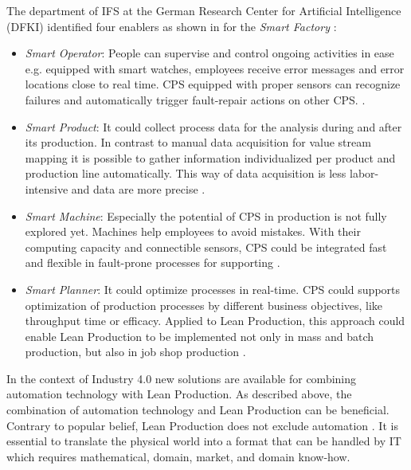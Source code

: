 {The department of \acs{IFS} at the German Research Center for Artificial Intelligence (\acs{DFKI}) identified four enablers as shown in  for the \textit{Smart Factory} \cite{LEANKOLBERG}: 
\begin{itemize}
	\item \textit{Smart Operator}: People can supervise and control ongoing activities in ease e.g. equipped with smart watches, employees receive error messages and error locations close to real time. \acs{CPS} equipped with proper sensors can recognize failures and automatically trigger fault-repair actions on other \acs{CPS}. \cite{LEANKOLBERG}.
	\item \textit{Smart Product}: It could collect process data for the analysis during and after its production. In contrast to manual data acquisition for value stream mapping it is possible to gather information individualized per product and production line automatically. This way of data acquisition is less labor-intensive and data are more precise \cite{LEANKOLBERG}.
	\item \textit{Smart Machine}: Especially the potential of \acs{CPS} in production is not fully explored yet. Machines help employees to avoid mistakes. With their computing capacity and connectible sensors, \acs{CPS} could be integrated fast and flexible in fault-prone processes for supporting \cite{LEANKOLBERG}.
	\item \textit{Smart Planner}: It could optimize processes in real-time. \acs{CPS} could supports optimization of production processes by different business objectives, like throughput time or efficacy. Applied to Lean Production, this approach could enable Lean Production to be implemented not only in mass and batch production, but also in job shop production \cite{LEANKOLBERG}.
\end{itemize}

In the context of Industry 4.0 new solutions are available for combining automation technology with Lean Production. As described above, the combination of automation technology and Lean Production can be beneficial. Contrary to popular belief, Lean Production does not exclude automation \cite{LEANKOLBERG}. It is essential to translate the physical world into a format that can be handled by \acs{IT} which requires mathematical, domain, market, and domain know-how. 

}
